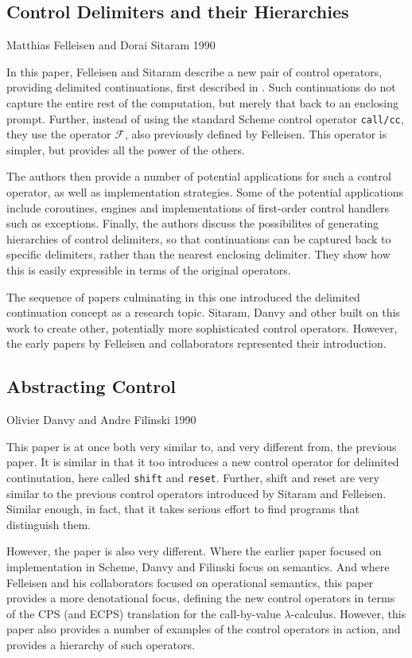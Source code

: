 \documentclass[12pt]{article}
\begin{document}
\subsection*{Control Delimiters and their Hierarchies}
Matthias Felleisen and Dorai Sitaram 1990 \cite{sitaram90control}

In this paper, Felleisen and Sitaram describe a new pair of control
operators, providing delimited continuations, first described in \cite{mf-prompts}.
Such continuations do not capture the entire rest of the computation,
but merely that back to an enclosing prompt.  Further, instead of
using the standard Scheme control operator {\tt call/cc}, they use the
operator $\mathcal{F}$, also previously defined by Felleisen.  This
operator is simpler, but provides all the power of the others.  

The authors then provide a number of potential applications for such a
control operator, as well as implementation strategies.  Some of the
potential applications include coroutines, engines and implementations
of first-order control handlers such as exceptions.  Finally, the
authors discuss the possibilites of generating hierarchies of control
delimiters, so that continuations can be captured back to specific
delimiters, rather than the nearest enclosing delimiter.  They show
how this is easily expressible in terms of the original operators.  

The sequence of papers culminating in this one introduced the delimited
continuation concept as a research topic.  Sitaram, Danvy and other
built on this work to create other, potentially more sophisticated
control operators.  However, the early papers by Felleisen and
collaborators represented their introduction.  

\subsection*{Abstracting Control}
Olivier Danvy and Andre Filinski 1990 \cite{danvy90abstracting}

This paper is at once both very similar to, and very different from,
the previous paper.  It is similar in that it too introduces a new
control operator for delimited continutation, here called {\tt shift}
and {\tt reset}.  Further, shift and reset are very similar to the
previous control operators introduced by Sitaram and Felleisen.
Similar enough, in fact, that it takes serious effort to find programs
that distinguish them.  

However, the paper is also very different.  Where the earlier paper
focused on implementation in Scheme, Danvy and Filinski focus on
semantics.  And where Felleisen and his collaborators focused on
operational semantics, this paper provides a more denotational focus,
defining the new control operators in terms of the CPS (and ECPS)
translation for the call-by-value $\lambda$-calculus.  However, this
paper also provides a number of examples of the control operators in
action, and provides a hierarchy of such operators.  
\end{document}
